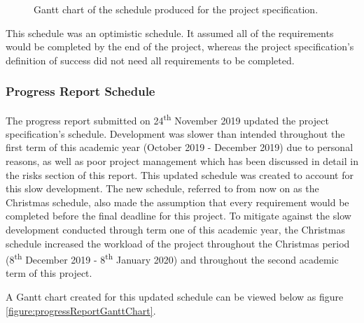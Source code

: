 \documentclass{article}
\begin{document}
\begin{figure}[H]
	\centering
	\caption{Gantt chart of the schedule produced for the project specification.}
	\label{figure:projectSpecGanttChart}
\end{figure}

This schedule was an optimistic schedule. It assumed all of the requirements would be completed by the end of the project, whereas the project specification's definition of success did not need all requirements to be completed. 

\subsubsection{Progress Report Schedule}

The progress report submitted on 24\textsuperscript{th} November 2019 updated the project specification's schedule. Development was slower than intended throughout the first term of this academic year (October 2019 - December 2019) due to personal reasons, as well as poor project management which has been discussed in detail in the risks section of this report. This updated schedule was created to account for this slow development. The new schedule, referred to from now on as the Christmas schedule, also made the assumption that every requirement would be completed before the final deadline for this project. To mitigate against the slow development conducted through term one of this academic year, the Christmas schedule increased the workload of the project throughout the Christmas period (8\textsuperscript{th} December 2019 - 8\textsuperscript{th} January 2020) and throughout the second academic term of this project. \par

A Gantt chart created for this updated schedule can be viewed below as figure \ref{figure:progressReportGanttChart}. \par
\end{document}
